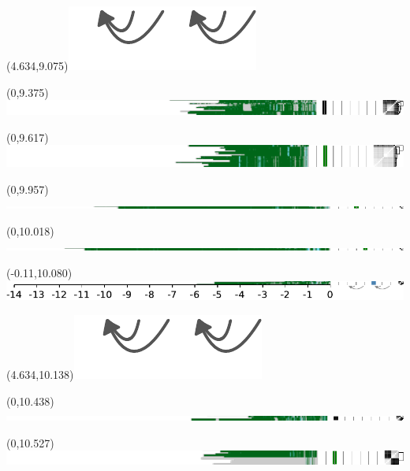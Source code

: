 \documentclass{article}
\begin{document}
\begin{textblock}{13}(4.634,9.075)\includegraphics[width=.78in,keepaspectratio]{Figure_4/fatter-arrows.pdf}\end{textblock}
\begin{textblock}{13}(0,9.375)\includegraphics{./Figure_S4/chr9-HG001.pdf}\end{textblock}
\begin{textblock}{13}(0,9.617)\includegraphics{./Figure_S4/chr9-HG002.pdf}\end{textblock}
\begin{textblock}{13}(0,9.957)\includegraphics{./Figure_S4/chr9-HG003.pdf}\end{textblock}
\begin{textblock}{13}(0,10.018)\includegraphics{./Figure_S4/chr9-HG004.pdf}\end{textblock}
\begin{textblock}{13}(-0.11,10.080)\includegraphics{./Figure_S4/chr9-HG005.pdf}\end{textblock}
\begin{textblock}{13}(4.634,10.138)\includegraphics[width=.78in,keepaspectratio]{Figure_4/fatter-arrows.pdf}\end{textblock}
\begin{textblock}{13}(0,10.438)\includegraphics{./Figure_S4/chr12-HG001.pdf}\end{textblock}
\begin{textblock}{13}(0,10.527)\includegraphics{./Figure_S4/chr12-HG002.pdf}\end{textblock}
\end{document}
